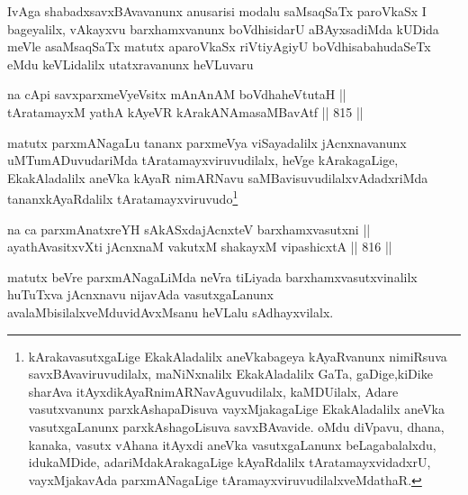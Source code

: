 
\begin{artha}
IvAga shabadxsavxBAvavanunx anusarisi modalu saMsaqSaTx paroVkaSx I bageyalilx, vAkayxvu barxhamxvanunx boVdhisidarU aBAyxsadiMda kUDida meVle asaMsaqSaTx matutx aparoVkaSx riVtiyAgiyU boVdhisabahudaSeTx eMdu keVLidalilx utatxravanunx heVLuvaru\ndash 
\end{artha}

\begin{shl}
na cApi savxparxmeVyeV\s sitx mAnAnAM boVdhaheVtutaH || \\
tAratamayxM yathA kAyeVR kArakANAmasaMBavAtf \hfill || 815 ||  
\end{shl}

\begin{artha}
matutx parxmANagaLu tananx parxmeVya viSayadalilx jAcnxnavanunx uMTumADuvudariMda tAratamayxviruvudilalx, heVge kArakagaLige, EkakAladalilx aneVka kAyaR nimARNavu saMBavisuvudilalxvAdadx\-riMda tananxkAyaRdalilx tAratamayxviruvudo\footnote{kArakavasutxgaLige EkakAladalilx aneVkabageya kAyaRvanunx nimiRsuva savxBAvaviruvudilalx, maNiNxnalilx EkakAladalilx GaTa, gaDige,kiDike sharAva itAyxdikAyaRnimARNavAguvudilalx, kaMDUilalx, Adare vasutxvanunx parxkAshapaDisuva vayxMjakagaLige EkakAladalilx aneVka vasutxgaLanunx parxkAshagoLisuva savxBAvavide. oMdu diVpavu, dhana, kanaka, vasutx vAhana itAyxdi aneVka vasutxgaLanunx beLagabalalxdu, idukaMDide, adariMdakArakagaLige kAyaRdalilx tAratamayxvidadxrU, vayxMjakavAda parxmANagaLige tAramayxviruvudilalxveMdathaR.}
\end{artha}

\begin{shl}
na ca parxmAnatxreYH sAkASxdajAcnxteV barxhamxvasutxni || \\
ayathAvasitxvXti jAcnxnaM vakutxM shakayxM vipashicxtA \hfill || 816 ||  
\end{shl}

\begin{artha}
matutx beVre parxmANagaLiMda neVra tiLiyada barxhamxvasutxvinalilx huTuTxva jAcnxnavu nijavAda vasutxgaLanunx avalaMbisilalxveMdu\break vidAvxMsanu heVLalu sAdhayxvilalx.
\end{artha}


